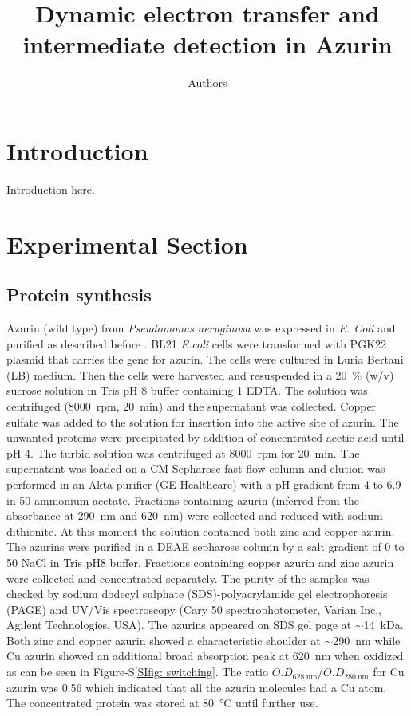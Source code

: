\documentclass[journal=jacsat,manuscript=article]{achemso}
\author{Authors}
\affiliation{Huygens-Kamerlingh Onnes Laboratory, Leiden University, RA, Leiden, The Netherlands}
\title[]
{Dynamic electron transfer and intermediate detection in Azurin}
\begin{document}
\section{Introduction}
Introduction here.
\section{Experimental Section}

\subsection{Protein synthesis}
Azurin (wild type) from \textit{Pseudomonas aeruginosa} was expressed in \textit{E. Coli} and purified as described before \citep{kamp1990purification}.
BL21 \textit{E.coli} cells were transformed with PGK22 plasmid that carries the gene for azurin.
The cells were cultured in Luria Bertani (LB) medium.
Then the cells were harvested and resuspended in a \SI{20}{\percent} (w/v) sucrose solution in Tris pH 8 buffer containing \SI{1}{\mM} EDTA.
The solution was centrifuged (\SI{8000}{ rpm}, \SI{20}{\minute}) and the supernatant was collected.
Copper sulfate was added to the solution for insertion into the active site of azurin.
The unwanted proteins were precipitated by addition of concentrated acetic acid until pH 4. 
The turbid solution was centrifuged at \SI{8000}{ rpm} for \SI{20}{\minute}.
The supernatant was loaded on a CM Sepharose fast flow column and elution was performed in an Akta purifier (GE Healthcare) with a pH gradient from 4 to 6.9 in 
\SI{50}{\mM} ammonium acetate.
Fractions containing azurin (inferred from the absorbance at \SI{290}{\nm} and \SI{620}{\nm}) were collected and reduced with sodium dithionite.
At this moment the solution contained both zinc and copper azurin.
The azurins were purified in a DEAE sepharose column by a salt gradient of 0 to \SI{50}{\mM} NaCl in Tris pH8 buffer. 
Fractions containing copper azurin and zinc azurin were collected and concentrated separately.
The purity of the samples was checked by sodium dodecyl sulphate (SDS)-polyacrylamide gel electrophoresis (PAGE) and UV/Vis spectroscopy (Cary 50 spectrophotometer, Varian Inc., Agilent Technologies, USA).
The azurins appeared on SDS gel page at $\sim$\SI{14}{ kDa}.
Both zinc and copper azurin showed a characteristic shoulder at ${\sim}$\SI{290}{\nm} while Cu azurin showed an additional 
broad absorption peak at \SI{620}{\nm} when oxidized as can be seen in Figure-S\ref{SIfig: switching}. 
The ratio $O.D_{\SI{628}{\nm}}/O.D_{\SI{280}{\nm}}$ for Cu azurin was 0.56 which indicated that all the azurin molecules had a Cu atom. 
The concentrated protein was stored at \SI{80}{\celsius} until further use.
\end{document}
